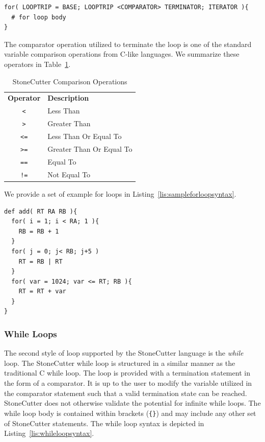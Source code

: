 \documentclass{article}
\begin{document}
\vspace{0.125in}
\begin{lstlisting}[frame=single,style=base,caption={For Loop Syntax},captionpos=b,label={lis:forloopsyntax}]
for( LOOPTRIP = BASE; LOOPTRIP <COMPARATOR> TERMINATOR; ITERATOR ){
  # for loop body
}
\end{lstlisting}

The comparator operation utilized to terminate the loop is one of the standard 
variable comparison operations from C-like languages.  We summarize these operators in 
Table~\ref{tab:compreops}.  

\begin{table}[h]
\begin{center}
\caption{StoneCutter Comparison Operations}
\vspace{0.125in}
\label{tab:compreops}
\begin{tabular}{|c|l|}
\hline
\textbf{Operator} & \textbf{Description} \\
\texttt{<} & Less Than\\
\hline
\texttt{>} & Greater Than\\
\hline
\texttt{<=} & Less Than Or Equal To\\
\hline
\texttt{>=} & Greater Than Or Equal To\\
\hline
\texttt{==} & Equal To\\
\hline
\texttt{!=} & Not Equal To\\
\hline
\end{tabular}
\end{center}
\end{table}

We provide a set of example for loops in Listing~\ref{lis:sampleforloopsyntax}.  

\vspace{0.125in}
\begin{lstlisting}[frame=single,style=base,caption={Sample For Loop Syntax},captionpos=b,label={lis:sampleforloopsyntax}]
def add( RT RA RB ){
  for( i = 1; i < RA; 1 ){
    RB = RB + 1
  }
  for( j = 0; j< RB; j+5 )
    RT = RB | RT
  }
  for( var = 1024; var <= RT; RB ){
    RT = RT + var
  }
}
\end{lstlisting}

\clearpage
\subsubsection{While Loops}
\label{sec:WhileLoops}

The second style of loop supported by the StoneCutter language is the \textit{while} loop.  The StoneCutter 
while loop is structured in a similar manner as the traditional C while loop.  The loop is provided with a 
termination statement in the form of a comparator.  It is up to the user to modify the variable utilized 
in the comparator statement such that a valid termination state can be reached.  StoneCutter does not otherwise 
validate the potential for infinite while loops.  The while loop body is contained within brackets 
(\texttt{\{\}}) and may include any other set of StoneCutter statements.  The while loop syntax is depicted in 
Listing~\ref{lis:whileloopsyntax}.  
\end{document}
